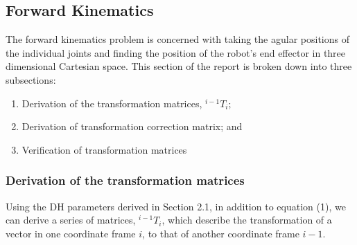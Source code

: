 \documentclass[a4paper]{article}
\begin{document}
\subsection{Forward Kinematics}
The forward kinematics problem is concerned with taking the agular positions of the individual joints and finding the position of the robot's end effector in three dimensional Cartesian space. This section of the report is broken down into three subsections:
\begin{enumerate}
	\item Derivation of the transformation matrices, $^{i-1} T_i$;
	\item Derivation of transformation correction matrix; and 
	\item Verification of transformation matrices
\end{enumerate}

\subsubsection{Derivation of the transformation matrices}
Using the DH parameters derived in Section 2.1, in addition to equation (1), we can derive a series of matrices, $^{i-1} T_i$, which describe the transformation of a vector in one coordinate frame $i$, to that of another coordinate frame $i-1$.\\
\end{document}
